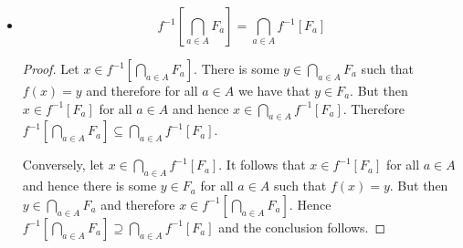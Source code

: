 \begin{itemize}
\begin{proof}
        Conversely, let $y \in \bigcap_{a \in A} f[F_a]$. Then $y \in f[F_a]$ for all $a \in A$. For the same argument as before to be applied, it is required that $f$ is one to one - otherwise, there can be the case that $\bigcap_{a \in A} = \emptyset$. Hence, if $f$ is one to one, it follows that  there is some $x \in F_a$ for all $a \in A$ such that $f(x) = y$ and hence $x \in \bigcap_{a \in A} F_a$. Therefore $y \in f[\bigcap_{a \in A} F_a]$ and the conclusion follows. 
    \end{proof}
    
    \item $$f^{-1}[\bigcap_{a \in A} F_a] = \bigcap_{a \in A} f^{-1}[F_a]$$
    
    \begin{proof}
        Let $x \in f^{-1}[\bigcap_{a \in A} F_a]$. There is some $y \in \bigcap_{a \in A} F_a$ such that $f(x) = y$ and therefore for all $a \in A$ we have that $y \in F_a$. But then $x \in f^{-1}[F_a]$ for all $a \in A$ and hence $x \in \bigcap_{a \in A} f^{-1}[F_a]$. Therefore $f^{-1}[\bigcap_{a \in A} F_a] \subseteq \bigcap_{a \in A} f^{-1}[F_a]$.
        
        Conversely, let $x \in \bigcap_{a \in A} f^{-1}[F_a]$. It follows that $x \in f^{-1}[F_a]$ for all $a \in A$ and hence  there is some $y \in F_a$ for all $a \in A$ such that $f(x) = y$. But then $y \in \bigcap_{a \in A} F_a$ and therefore $x \in f^{-1}[\bigcap_{a \in A} F_a]$. Hence $f^{-1}[\bigcap_{a \in A} F_a] \supseteq \bigcap_{a \in A} f^{-1}[F_a]$ and the conclusion follows.
    \end{proof}
\end{itemize}

\newpage

